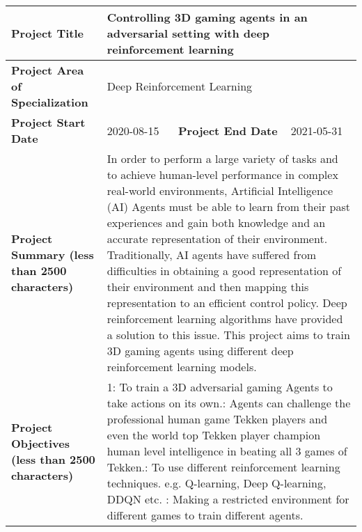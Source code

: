 \documentclass{article} %
\begin{document}
	\begin{tabular}{|p{1.2in}|p{1.0in}|p{0.9in}|p{0.9in}|} \hline 
		\normalsize \textbf { Project Title} & \multicolumn{3}{|p{4.0in}|}{Controlling 3D gaming agents in an adversarial setting with deep reinforcement learning} \\ \hline 
		\textbf{Project Area of Specialization} & \multicolumn{3}{|p{2.9in}|}{Deep Reinforcement Learning} \\ \hline 
		\textbf{Project Start Date} & 2020-08-15 & \textbf{Project End Date} & 2021-05-31 \\ \hline 
		\textbf{Project Summary (less than 2500 characters)} & \multicolumn{3}{|p{4.0in}|}{In order to perform a large variety of tasks and to achieve human-level performance in complex real-world environments, Artificial Intelligence (AI) Agents must be able to learn from their past experiences and gain both knowledge and an accurate representation of their environment. Traditionally, AI agents have suffered from difficulties in obtaining a good representation of their environment and then mapping this representation to an efficient control policy. Deep reinforcement learning algorithms have provided a solution to this issue. This project aims to train 3D gaming agents using different deep reinforcement learning models.} \\ \hline 
		\textbf{Project Objectives (less than 2500 characters)} & \multicolumn{3}{|p{4.0in}|}{\textbf{ }1: To train a 3D adversarial gaming Agents to take actions on its own.\newline 2: Agents can challenge the professional human game Tekken players and even the world top Tekken player champion human level intelligence in beating all 3 games of Tekken.\newline  3: To use different reinforcement learning techniques.  e.g. Q-learning, Deep Q-learning, DDQN etc. \newline 4: Making a restricted environment for different games to train different agents. \newline ~} \\ \hline
			\end{tabular}
		
\end{document}
